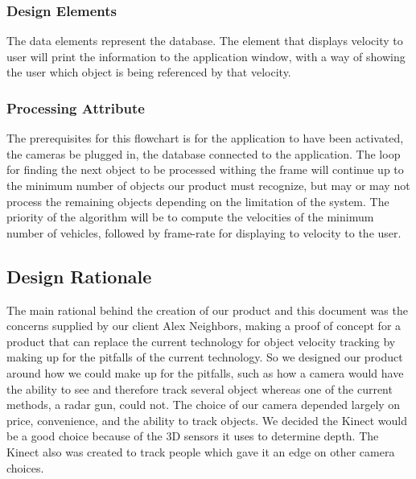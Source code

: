 \documentclass[onecolumn, draftclsnofoot,10pt, compsoc]{IEEEtran}
\begin{document}
\subsubsection{Design Elements}
The data elements represent the database. 
The element that displays velocity to user will print the information to the application window, with a way of showing the user which object is being referenced by that velocity.


\subsubsection{Processing Attribute}
The prerequisites for this flowchart is for the application to have been activated, the cameras be plugged in, the database connected to the application. 
The loop for finding the next object to be processed withing the frame will continue up to the minimum number of objects our product must recognize, but may or may not process the remaining objects depending on the limitation of the system.
The priority of the algorithm will be to compute the velocities of the minimum number of vehicles, followed by frame-rate for displaying to velocity to the user.




\subsection{Design Rationale}
The main rational behind the creation of our product and this document was the concerns supplied by our client Alex Neighbors, making a proof of concept for a product that can replace the current technology for object velocity tracking by making up for the pitfalls of the current technology.
So we designed our product around how we could make up for the pitfalls, such as how a camera would have the ability to see and therefore track several object whereas one of the current methods, a radar gun, could not.
The choice of our camera depended largely on price, convenience, and the ability to track objects.
We decided the Kinect would be a good choice because of the 3D sensors it uses to determine depth.
The Kinect also was created to track people which gave it an edge on other camera choices.
\end{document}
